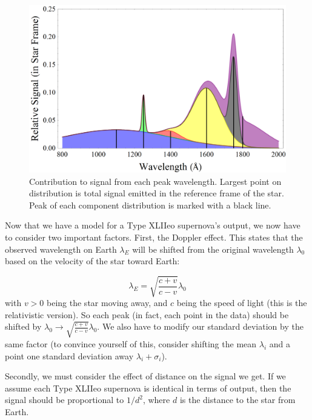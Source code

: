 \documentclass{article}
\begin{document}
\begin{figure}
\begin{center}
\includegraphics[scale=.95]{hubblecontrib.png}
\caption{Contribution to signal from each peak wavelength. Largest point on distribution is total signal emitted
in the reference frame of the star. Peak of each component distribution is marked with a black line.}
\label{fig:spectrum}
\end{center}
\end{figure}

Now that we have a model for a Type XLIIeo supernova's output, we now have to consider two important factors.
First, the Doppler effect. This states that the observed wavelength on Earth $\lambda_{E}$ will be shifted
from the original wavelength $\lambda_0$ based on the velocity of the star toward Earth:

\begin{equation}
\lambda_E=\sqrt{\frac{c+v}{c-v}}\lambda_0
\end{equation}
with $v>0$ being the star moving away, and $c$ being the speed of light (this is the relativistic version). So each
peak (in fact, each point in the data) should be shifted by $\lambda_0\rightarrow\sqrt{\frac{c+v}{c-v}}\lambda_0$.
We also have to modify our standard deviation by the same factor (to convince yourself of this, consider shifting
the mean $\lambda_i$ and a point one standard deviation away $\lambda_i+\sigma_i$).

Secondly, we must consider the effect of distance on the signal we get. If we assume each Type XLIIeo supernova is identical
in terms of output, then the signal should be proportional to $1/d^2$, where $d$ is the distance to the star from Earth.
\end{document}
